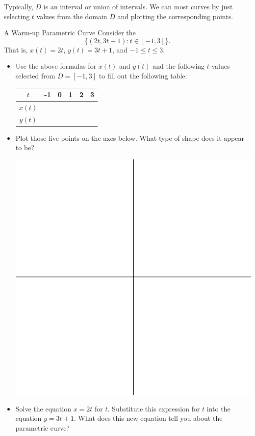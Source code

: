 Typically, $D$ is an interval or union of intervals.  We can  most curves by just selecting $t$ values from the domain $D$ and plotting the corresponding points.  

\begin{exercise}{A Warm-up Parametric Curve \Coffeecup \Coffeecup} 
Consider the  $$\lbrace\left(2t,3t+1\right): t\in [-1,3] \rbrace. $$
That is, $x(t)= 2t $, $y(t)=3t+1$, and $-1 \leq t \leq 3$.
\begin{itemize}
\item Use the above formulas for $x(t)$ and $y(t)$ and the following $t$-values selected from $D=[-1,3]$ to fill out the following table:

\begin{center}
\begin{tabular}{|c|c|c|c|c|c|} \hline
$t$ & -1 & 0 & 1 & 2 & 3 \\ \hline
$x(t)$ & & & & & \\
$y(t)$ & & & & & \\ \hline
\end{tabular}
\end{center}

\item Plot those five points on the axes below.  What type of shape does it appear to be?

\begin{center}
\includegraphics[scale=0.8]{quadall}
\end{center}

\item Solve the equation $ x= 2t$ for $t$.  Substitute this expression for $t$ into the equation $y=3t+1$.  What does this new equation tell you about the parametric curve?
\vspace*{1in}

\end{itemize} 
\end{exercise}

